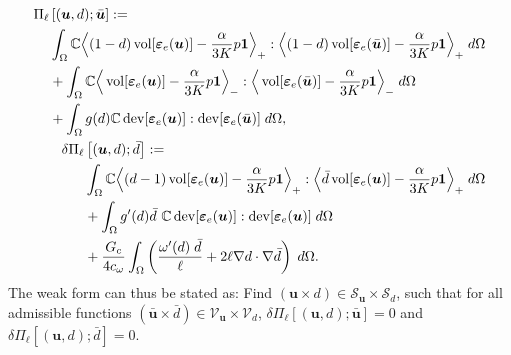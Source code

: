 \begin{subequations} \label{Eq:Residual}
	\begin{align}
	\begin{split}\label{Eq:Residual_i}
	\Pi_\ell &\left[(\bm{u}, d); \bar{\bm{u}} \right]:= \\&
	\int_{\Omega} \mathbb{C}\Big\langle(1-d)\operatorname{vol}[\bm{\varepsilon}_e(\bm{u})]-\frac{\alpha}{3K}p\mathbf{1}\Big\rangle_{+}:\Big\langle(1-d)\operatorname{vol}[\bm{\varepsilon}_e(\bar{\bm{u}})]-\frac{\alpha}{3K}p\mathbf{1}\Big\rangle_{+}\; d\Omega \\&+
	\int_{\Omega}\mathbb{C}\Big\langle\operatorname{vol}[\bm{\varepsilon}_e(\bm{u})]-\frac{\alpha}{3K}p\mathbf{1}\Big\rangle_{-}:\Big\langle\operatorname{vol}[\bm{\varepsilon}_e(\bar{\bm{u}})]-\frac{\alpha}{3K}p\mathbf{1}\Big\rangle_{-}\; d\Omega \\&+
	\int_{\Omega} g(d)\mathbb{C}\operatorname{dev}[\bm{\varepsilon}_e({\bm{u}})]:\operatorname{dev}[\bm{\varepsilon}_e(\bar{\bm{u}})]\; d\Omega,
	\end{split}\\
	\begin{split}\label{Eq:Residual_ii}
	\delta \Pi_\ell & \left[(\bm{u}, d);  \bar{d} \right]:=\\&
	\int_{\Omega} \mathbb{C}\Big\langle(d-1)\operatorname{vol}[\bm{\varepsilon}_e(\bm{u})]-\frac{\alpha}{3K}p\mathbf{1}\Big\rangle_{+}:\Big\langle\bar{d}\operatorname{vol}[\bm{\varepsilon}_e(\bm{u})]-\frac{\alpha}{3K}p\mathbf{1}\Big\rangle_{+}\; d\Omega \\&+
	\int_{\Omega} g'(d)\bar{d}~\mathbb{C}\operatorname{dev}[\bm{\varepsilon}_e({\bm{u}})]:\operatorname{dev}[\bm{\varepsilon}_e({\bm{u}})]\; d\Omega\\&+
	\frac{G_c}{4c_{\omega}} \int_\Omega  \left(\frac{\omega'(d)\;\bar{d}}{\ell} + 2\ell \nabla d\cdot\nabla \bar{d} \right)\;d\Omega.
	\end{split}
	\end{align}
\end{subequations}
The weak form can thus be stated as: Find $\left(\bm{u}\times d \right)\in\mathscr{S}_{\bm{u}}\times\mathscr{S}_d$, such that for all admissible functions $\left(\bar{\bm{u}}\times\bar{d} \right)\in\mathscr{V}_{\bm{u}}\times\mathscr{V}_d$, $\delta\Pi_\ell\left[(\bm{u},d); \bar{\bm{u}}\right]=0$ and $\delta\Pi_\ell\left[(\bm{u},d); \bar{d}\right]=0$.

